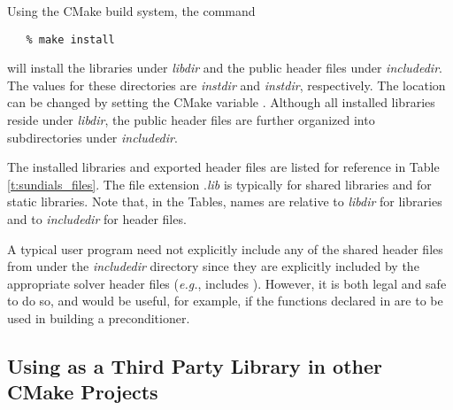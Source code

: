 Using the CMake {\sundials} build system, the command
\begin{verbatim}
   % make install
\end{verbatim}
will install the libraries under {\em libdir} and the public header
files under {\em includedir}. The values for these directories are
{\em instdir} and {\em instdir},
respectively. The location can be changed by setting the CMake variable .
Although all installed libraries reside under {\em libdir}, the public
header files are further organized into subdirectories under {\em includedir}.

The installed libraries and exported header files are listed for
reference in Table \ref{t:sundials_files}.
The file extension .{\em lib}
is typically  for shared libraries and  for static libraries.
Note that, in the Tables, names are relative to {\em libdir}
for libraries and to {\em includedir} for header files.

A typical user program need not explicitly include any of the shared
{\sundials} header files from under the {\em includedir}
directory since they are explicitly included by the appropriate solver
header files ({\em e.g.},  includes
). However, it is both legal and safe to do so,
and would be useful, for example, if the functions declared in 
are to be used in building a preconditioner.

\subsection{Using {\sundials} as a Third Party Library in other CMake Projects}

